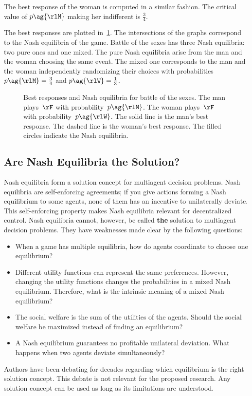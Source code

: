 The best response of the woman is computed in a similar fashion.
The critical value of \(p\ag{\rlM}\) making her indifferent is \(\frac{3}{4}\).

The best responses are plotted in~\cref{fig:bos_best_response}.
The intersections of the graphs correspond to the Nash equilibria of the game.
Battle of the sexes has three Nash equilibria: two pure ones and one mixed.
The pure Nash equilibria arise from the man and the woman choosing the same event.
The mixed one corresponds to the man and the woman independently randomizing their choices with probabilities \(p\ag{\rlM} = \frac{3}{4}\) and \(p\ag{\rlW} = \frac{1}{3}\).

\begin{figure}[!ht]
\caption[Best responses and Nash equilibria for battle of the sexes.]{
Best responses and Nash equilibria for battle of the sexes.
The man plays~\(\rF\) with probability~\(p\ag{\rlM}\).
The woman plays~\(\rF\) with probability~\(p\ag{\rlW}\).
The solid line is the man's best response.
The dashed line is the woman's best response.
The filled circles indicate the Nash equilibria.
}
\label{fig:bos_best_response}
\centering
\begin{tikzpicture}

\end{tikzpicture}
\end{figure}

\subsection{Are Nash Equilibria the Solution?}
\label{sec:are_nash_equilibria_the_solution}
Nash equilibria form a solution concept for multiagent decision problems.
Nash equilibria are self-enforcing agreements; if you give actions forming a Nash equilibrium to some agents, none of them has an incentive to unilaterally deviate.
This self-enforcing property makes Nash equilibria relevant for decentralized control.
Nash equilibria cannot, however, be called \textbf{the} solution to multiagent decision problems.
They have weaknesses made clear by the following questions:
\begin{itemize}
\item When a game has multiple equilibria, how do agents coordinate to choose one equilibrium?
\item Different utility functions can represent the same preferences.
However, changing the utility functions changes the probabilities in a mixed Nash equilibrium.
Therefore, what is the intrinsic meaning of a mixed Nash equilibrium?
\item The social welfare is the sum of the utilities of the agents.
Should the social welfare be maximized instead of finding an equilibrium?
\item A Nash equilibrium guarantees no profitable unilateral deviation.
What happens when two agents deviate simultaneously?
\end{itemize}
Authors have been debating for decades regarding which equilibrium is the right solution concept.
This debate is not relevant for the proposed research.
Any solution concept can be used as long as its limitations are understood.

